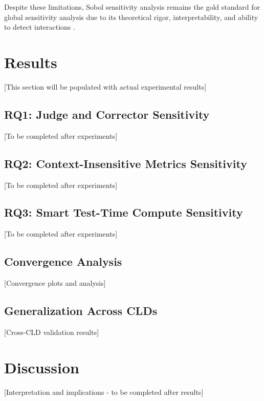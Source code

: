 Despite these limitations, Sobol sensitivity analysis remains the gold standard for global sensitivity analysis due to its theoretical rigor, interpretability, and ability to detect interactions \citep{saltelli2008global}.

\section{Results}
\label{sec:sa_results}

[This section will be populated with actual experimental results]

\subsection{RQ1: Judge and Corrector Sensitivity}

[To be completed after experiments]

\subsection{RQ2: Context-Insensitive Metrics Sensitivity}

[To be completed after experiments]

\subsection{RQ3: Smart Test-Time Compute Sensitivity}

[To be completed after experiments]

\subsection{Convergence Analysis}

[Convergence plots and analysis]

\subsection{Generalization Across CLDs}
\label{sec:sa_generalization}

[Cross-CLD validation results]

\section{Discussion}
\label{sec:sa_discussion}

[Interpretation and implications - to be completed after results]

